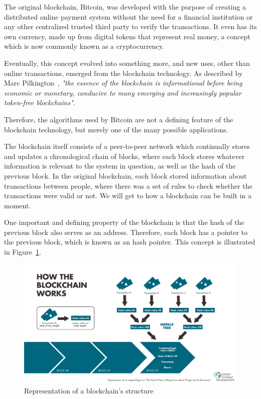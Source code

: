 The original blockchain, Bitcoin, was developed with the purpose of creating a distributed online payment system without the need for a financial institution or any other centralized trusted third party to verify the transactions. It even has its own currency, made up from digital tokens that represent real money, a concept which is now commonly known as a cryptocurrency.

Eventually, this concept evolved into something more, and new uses, other than online transactions, emerged from the blockchain technology. As described by Marc Pilkington~\cite{Pilkington2015}, \textit{"the essence of the blockchain is informational before being economic or monetary, conducive to many emerging and increasingly popular token-free blockchains"}.

Therefore, the algorithms used by Bitcoin are not a defining feature of the blockchain technology, but merely one of the many possible applications.
    
    The blockchain itself consists of a peer-to-peer network which continually stores and updates a chronological chain of blocks, where each block stores whatever information is relevant to the system in question, as well as the hash of the previous block. In the original blockchain, each block stored information about transactions between people, where there was a set of rules to check whether the transactions were valid or not. We will get to how a blockchain can be built in a moment.
    
    One important and defining property of the blockchain is that the hash of the previous block also serves as an address. Therefore, each block has a pointer to the previous block, which is known as an hash pointer. This concept is illustrated in Figure~\ref{fig:blockchain_workflow}.
    
\begin{figure}[h]
\centering
\includegraphics[scale=0.35]{media/Blockchain_workflow.png}
\caption{Representation of a blockchain's structure}
\label{fig:blockchain_workflow}
\end{figure}

